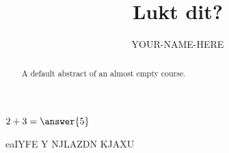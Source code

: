 \documentclass{ximera}
\title{Lukt dit?}
\author{YOUR-NAME-HERE}
\begin{document}
\begin{abstract}
    A default abstract of an almost empty course.
\end{abstract}
\maketitle


\begin{exercise}
    $2+3=\answer{5}$
    \begin{oplossing}[toon]
        eaIYFE Y NJLAZDN KJAXU
    \end{oplossing}
\end{exercise}
\end{document}
